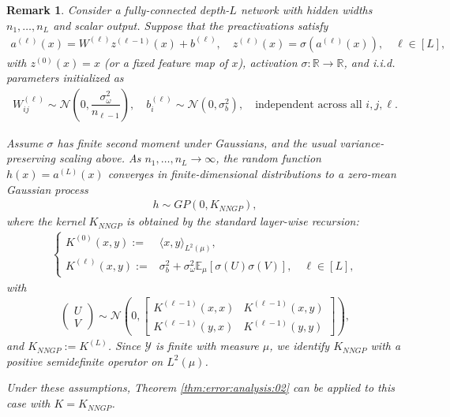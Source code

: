 \documentclass[letterpaper,11pt]{article}
\numberwithin{equation}{section}
\newtheorem{remark}[theorem]{Remark}
\numberwithin{equation}{section}
\begin{document}
\begin{remark}
    Consider a fully-connected depth-$L$ network with hidden widths $n_1,\ldots, n_L$ and scalar output. Suppose that the preactivations satisfy
    \begin{align*}
        a^{(\ell)}(x)=W^{(\ell)}z^{(\ell -1)}(x) + b^{(\ell)},\quad z^{(\ell)}(x)=\sigma (a^{(\ell)}(x)),\quad \ell \in [L],
    \end{align*}
    with $z^{(0)}(x)=x$ (or a fixed feature map of $x$), activation $\sigma:\mathbb{R}\to \mathbb{R}$, and i.i.d. parameters initialized as 
    \begin{align*}
        W_{ij}^{(\ell)} \sim \mathcal{N} \left(0,\dfrac{\sigma_\omega^2}{n_{\ell-1}} \right),\quad b_i^{(\ell)} \sim \mathcal{N}(0,\sigma_b^2),\quad \text{independent across all }i,j,\ell.
    \end{align*}

    Assume $\sigma$ has finite second moment under Gaussians, and the usual variance-preserving scaling above. As $n_1,\ldots , n_L \to \infty$, the random function $h(x)=a^{(L)}(x)$ converges in finite-dimensional distributions to a zero-mean Gaussian process
    \begin{align*}
        h \sim GP (0,K_{NNGP}),
    \end{align*}
    where the kernel $K_{NNGP}$ is obtained by the standard layer-wise recursion:
    \begin{align*}
        \begin{cases} 
        K^{(0)}(x,y):=& \langle x,y  \rangle_{L^2(\mu)},\\
        K^{(\ell)}(x,y):=& \sigma_b^2 +\sigma_\omega^2 \mathbb{E}_{\mu} [\sigma (U) \sigma (V)],\quad \ell \in [L],
        \end{cases}
    \end{align*}
    with 
    \begin{align*}
        \left( 
            \begin{array}{c}
                 U\\V
            \end{array}
        \right) \sim \mathcal{N}  \left( 0, \left[ 
        \begin{array}{cc}
             K^{(\ell-1)} (x,x) & K^{(\ell-1)}(x,y)  \\
             K^{(\ell-1)}(y,x) & K^{(\ell-1)}(y,y) 
        \end{array}
        \right]
        \right),
    \end{align*}
    and $K_{NNGP}:=K^{(L)}$. Since $\mathcal{Y}$ is finite with measure $\mu$, we identify $K_{NNGP}$ with a positive semidefinite operator on $L^2(\mu)$.

    Under these assumptions, Theorem \ref{thm:error:analysis:02} can be applied to this case with $K=K_{NNGP}$.
\end{remark}
\end{document}
